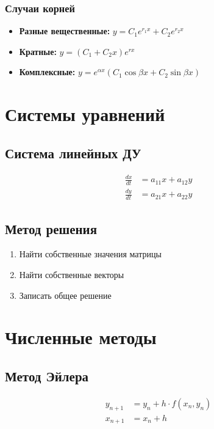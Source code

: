 \documentclass[10pt,landscape,a4paper]{article}
\begin{document}
\begin{multicols}{2}
\subsubsection{Случаи корней}
\begin{itemize}
    \item \textbf{Разные вещественные:} $y = C_1e^{r_1x} + C_2e^{r_2x}$
    \item \textbf{Кратные:} $y = (C_1 + C_2x)e^{rx}$
    \item \textbf{Комплексные:} $y = e^{\alpha x}(C_1\cos\beta x + C_2\sin\beta x)$
\end{itemize}

\section{Системы уравнений}

\subsection{Система линейных ДУ}
\begin{align}
    \frac{dx}{dt} &= a_{11}x + a_{12}y \\
    \frac{dy}{dt} &= a_{21}x + a_{22}y
\end{align}

\subsection{Метод решения}
\begin{enumerate}
    \item Найти собственные значения матрицы
    \item Найти собственные векторы
    \item Записать общее решение
\end{enumerate}

\section{Численные методы}

\subsection{Метод Эйлера}
\begin{align}
    y_{n+1} &= y_n + h \cdot f(x_n, y_n) \\
    x_{n+1} &= x_n + h
\end{align}


\end{multicols}
\end{document}

